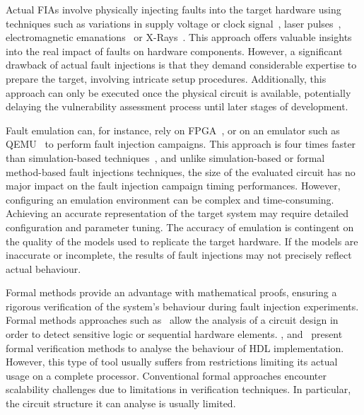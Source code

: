 Actual FIAs involve physically injecting faults into the target hardware using techniques such as variations in supply voltage or clock signal~\cite{BCNTW-06-procieee, BFP-19-tches}, laser pulses~\cite{BCNTW-06-procieee, CGVCBLC-22-cardis}, electromagnetic emanations~\cite{BCNTW-06-procieee} or X-Rays~\cite{GBD-23-paine}.
This approach offers valuable insights into the real impact of faults on hardware components.
However, a significant drawback of actual fault injections is that they demand considerable expertise to prepare the target, involving intricate setup procedures.
Additionally, this approach can only be executed once the physical circuit is available, potentially delaying the vulnerability assessment process until later stages of development.

Fault emulation can, for instance, rely on FPGA~\cite{CMLCVR-11-crypto}, or on an emulator such as QEMU~\cite{HGASO-21-fdtc,BLK-23-access} to perform fault injection campaigns. This approach is four times faster than simulation-based techniques~\cite{NNHRS-14-dsd}, and unlike simulation-based or formal method-based fault injections techniques, the size of the evaluated circuit has no major impact on the fault injection campaign timing performances.
However, configuring an emulation environment can be complex and time-consuming. Achieving an accurate representation of the target system may require detailed configuration and parameter tuning. The accuracy of emulation is contingent on the quality of the models used to replicate the target hardware. If the models are inaccurate or incomplete, the results of fault injections may not precisely reflect actual behaviour.

Formal methods provide an advantage with mathematical proofs, ensuring a rigorous verification of the system's behaviour during fault injection experiments. Formal methods approaches such as~\cite{BSSMG-21-tchess} allow the analysis of a circuit design in order to detect sensitive logic or sequential hardware elements. \cite{ANR-18-ices}, \cite{BBCFGS-19-esorics} and~\cite{SVPMRDKMS-24-eprint} present formal verification methods to analyse the behaviour of HDL implementation.
However, this type of tool usually suffers from restrictions limiting its actual usage on a complete processor.
Conventional formal approaches encounter scalability challenges due to limitations in verification techniques.
In particular, the circuit structure it can analyse is usually limited.

